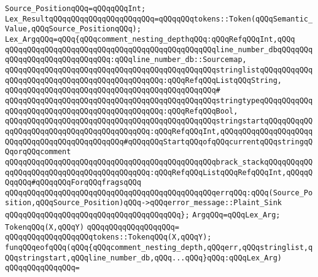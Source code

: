 \verb|Source_PositionqQQq=qQQqqQQqInt;|\newline
\verb|Lex_ResultqQQqqQQqqQQqqQQqqQQqqQQq=qQQqqQQqtokens::Token(qQQqSemantic_Value,qQQqSource_PositionqQQq);|\newline
\newline
\verb|Lex_ArgqQQq=qQQq{qQQqcomment_nesting_depthqQQq:qQQqRefqQQqInt,qQQq|\newline
\verb|qQQqqQQqqQQqqQQqqQQqqQQqqQQqqQQqqQQqqQQqqQQqqQQqline_number_dbqQQqqQQqqQQqqQQqqQQqqQQqqQQqqQQq:qQQqline_number_db::Sourcemap,|\newline
\verb|qQQqqQQqqQQqqQQqqQQqqQQqqQQqqQQqqQQqqQQqqQQqqQQqstringlistqQQqqQQqqQQqqQQqqQQqqQQqqQQqqQQqqQQqqQQqqQQqqQQq:qQQqRefqQQqListqQQqString,|\newline
\verb|qQQqqQQqqQQqqQQqqQQqqQQqqQQqqQQqqQQqqQQqqQQqqQQq#|\newline
\verb|qQQqqQQqqQQqqQQqqQQqqQQqqQQqqQQqqQQqqQQqqQQqqQQqstringtypeqQQqqQQqqQQqqQQqqQQqqQQqqQQqqQQqqQQqqQQqqQQqqQQq:qQQqRefqQQqBool,|\newline
\verb|qQQqqQQqqQQqqQQqqQQqqQQqqQQqqQQqqQQqqQQqqQQqqQQqstringstartqQQqqQQqqQQqqQQqqQQqqQQqqQQqqQQqqQQqqQQqqQQq:qQQqRefqQQqInt,qQQqqQQqqQQqqQQqqQQqqQQqqQQqqQQqqQQqqQQqqQQqqQQq#qQQqqQQqStartqQQqofqQQqcurrentqQQqstringqQQqorqQQqcomment|\newline
\verb|qQQqqQQqqQQqqQQqqQQqqQQqqQQqqQQqqQQqqQQqqQQqqQQqbrack_stackqQQqqQQqqQQqqQQqqQQqqQQqqQQqqQQqqQQqqQQqqQQq:qQQqRefqQQqListqQQqRefqQQqInt,qQQqqQQqqQQq#qQQqqQQqForqQQqfragsqQQq|\newline
\newline
\verb|qQQqqQQqqQQqqQQqqQQqqQQqqQQqqQQqqQQqqQQqqQQqqQQqerrqQQq:qQQq(Source_Position,qQQqSource_Position)qQQq->qQQqerror_message::Plaint_Sink|\newline
\verb|qQQqqQQqqQQqqQQqqQQqqQQqqQQqqQQqqQQqqQQq};|\newline
\newline
\verb|ArgqQQq=qQQqLex_Arg;|\newline
\newline
\verb|TokenqQQq(X,qQQqY)|\newline
\verb|qQQqqQQqqQQqqQQqqQQq=|\newline
\verb|qQQqqQQqqQQqqQQqqQQqtokens::TokenqQQq(X,qQQqY);|\newline
\newline
\verb|funqQQqeofqQQq(qQQq{qQQqcomment_nesting_depth,qQQqerr,qQQqstringlist,qQQqstringstart,qQQqline_number_db,qQQq...qQQq}qQQq:qQQqLex_Arg)|\newline
\verb|qQQqqQQqqQQqqQQq=|\newline
